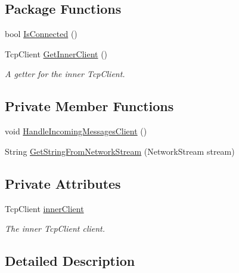 \subsection*{Package Functions}
\begin{DoxyCompactItemize}
\item 
bool \hyperlink{class_e_l_i_server_1_1_messaging_1_1_client_message_socket_a6068ed137f8fa6fcafcfe24764444ca5}{Is\+Connected} ()
\item 
Tcp\+Client \hyperlink{class_e_l_i_server_1_1_messaging_1_1_client_message_socket_a22a77525ef761a701c8be319d5e31a50}{Get\+Inner\+Client} ()
\begin{DoxyCompactList}\small\item\em A getter for the inner Tcp\+Client. \end{DoxyCompactList}\end{DoxyCompactItemize}
\subsection*{Private Member Functions}
\begin{DoxyCompactItemize}
\item 
void \hyperlink{class_e_l_i_server_1_1_messaging_1_1_client_message_socket_a3d83f53c3a99a74cc67092265a9d75ea}{Handle\+Incoming\+Messages\+Client} ()
\item 
String \hyperlink{class_e_l_i_server_1_1_messaging_1_1_client_message_socket_af243c323ef5f9a2e49b4ea5eb8de1dab}{Get\+String\+From\+Network\+Stream} (Network\+Stream stream)
\end{DoxyCompactItemize}
\subsection*{Private Attributes}
\begin{DoxyCompactItemize}
\item 
Tcp\+Client \hyperlink{class_e_l_i_server_1_1_messaging_1_1_client_message_socket_a1ef8df027624ee609a4d32db7ccdd2ef}{inner\+Client}
\begin{DoxyCompactList}\small\item\em The inner Tcp\+Client client. \end{DoxyCompactList}\end{DoxyCompactItemize}


\subsection{Detailed Description}


